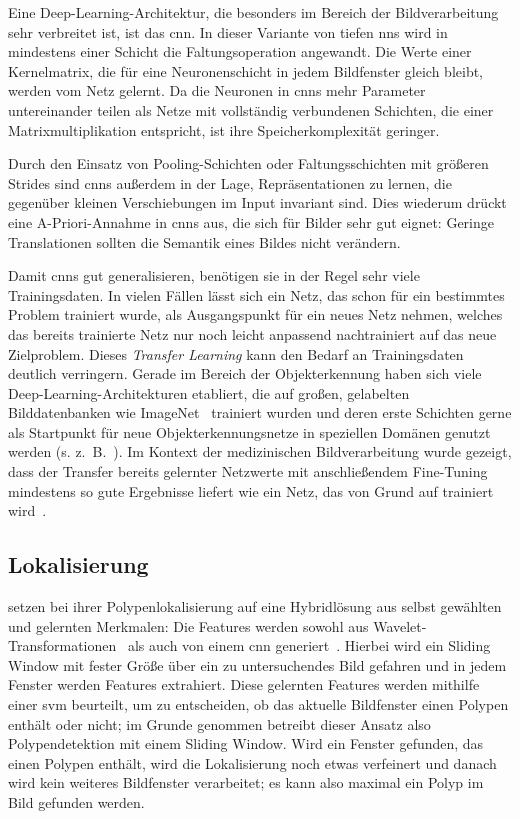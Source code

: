 Eine Deep-Learning-Architektur, die besonders im Bereich der Bildverarbeitung sehr verbreitet ist, ist das \gls{cnn}.
In dieser Variante von tiefen \glspl{nn} wird in mindestens einer Schicht die Faltungsoperation angewandt.
Die Werte einer Kernelmatrix, die für eine Neuronenschicht in jedem Bildfenster gleich bleibt, werden vom Netz gelernt.
Da die Neuronen in \glspl{cnn} mehr Parameter untereinander teilen als Netze mit vollständig verbundenen Schichten, die einer Matrixmultiplikation entspricht, ist ihre Speicherkomplexität geringer.

Durch den Einsatz von Pooling-Schichten oder Faltungsschichten mit größeren Strides sind \glspl{cnn} außerdem in der Lage, Repräsentationen zu lernen, die gegenüber kleinen Verschiebungen im Input invariant sind.
Dies wiederum drückt eine A-Priori-Annahme in \glspl{cnn} aus, die sich für Bilder sehr gut eignet:
Geringe Translationen sollten die Semantik eines Bildes nicht verändern.

Damit \glspl{cnn} gut generalisieren, benötigen sie in der Regel sehr viele Trainingsdaten.
In vielen Fällen lässt sich ein Netz, das schon für ein bestimmtes Problem trainiert wurde, als Ausgangspunkt für ein neues Netz nehmen, welches das bereits trainierte Netz nur noch leicht anpassend nachtrainiert auf das neue Zielproblem.
Dieses \emph{Transfer Learning} kann den Bedarf an Trainingsdaten deutlich verringern.
Gerade im Bereich der Objekterkennung haben sich viele Deep-Learning-Architekturen etabliert, die auf großen, gelabelten Bilddatenbanken wie ImageNet~\cite{Deng.2009} trainiert wurden und deren erste Schichten gerne als Startpunkt für neue Objekterkennungsnetze in speziellen Domänen genutzt werden (s. z.~B.~\cite{Simonyan.2014}).
Im Kontext der medizinischen Bildverarbeitung wurde gezeigt, dass der Transfer bereits gelernter Netzwerte mit anschließendem Fine-Tuning mindestens so gute Ergebnisse liefert wie ein Netz, das von Grund auf trainiert wird~\cite{Tajbakhsh.2016}.



\subsection{Lokalisierung}

\citeauthor{Billah.2017} setzen bei ihrer Polypenlokalisierung auf eine Hybridlösung aus selbst gewählten und gelernten Merkmalen:
Die Features werden sowohl aus Wavelet-Transformationen~\cite{Mallat.1989} als auch von einem \gls{cnn} generiert~\cite{Billah.2017}.
Hierbei wird ein Sliding Window mit fester Größe über ein zu untersuchendes Bild gefahren und in jedem Fenster werden Features extrahiert.
Diese gelernten Features werden mithilfe einer \gls{svm} beurteilt, um zu entscheiden, ob das aktuelle Bildfenster einen Polypen enthält oder nicht; im Grunde genommen betreibt dieser Ansatz also Polypendetektion mit einem Sliding Window.
Wird ein Fenster gefunden, das einen Polypen enthält, wird die Lokalisierung noch etwas verfeinert und danach wird kein weiteres Bildfenster verarbeitet; es kann also maximal ein Polyp im Bild gefunden werden.

